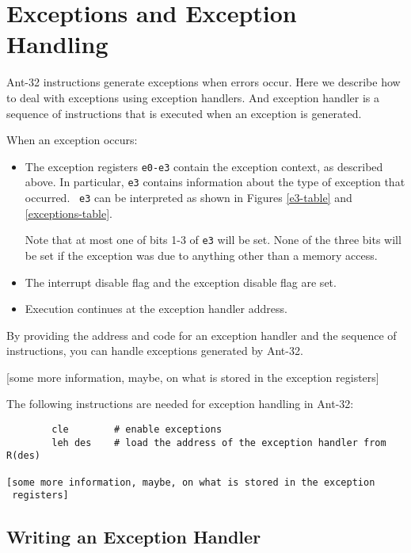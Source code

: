 

\chapter{Exceptions and Exception Handling}

Ant-32 instructions generate exceptions when errors occur.
Here we describe how to deal with exceptions using 
exception handlers. And exception handler is a sequence
of instructions that is executed when an exception is 
generated. 

When an exception occurs:

\begin{itemize}

\item The exception registers {\tt e0-e3} contain the exception
        context, as described above.  In particular, {\tt e3} contains
        information about the type of exception that occurred.  {\tt
        e3} can be interpreted as shown in Figures \ref{e3-table} and
        \ref{exceptions-table}.

        Note that at most one of bits 1-3 of {\tt e3} will be set.
        None of the three bits will be set if the exception was due to
        anything other than a memory access.

\item The interrupt disable flag and the exception disable flag are
        set.

\item Execution continues at the exception handler address.

\end{itemize}

By providing the address and code for an exception
handler and the sequence of instructions, you can handle 
exceptions generated by Ant-32.

[some more information, maybe, on what is stored in the exception
 registers]

The following instructions are needed for exception handling in 
Ant-32: 

\begin{verbatim}
        cle        # enable exceptions
        leh des    # load the address of the exception handler from R(des) 

[some more information, maybe, on what is stored in the exception
 registers]
\end{verbatim}

\section{Writing an Exception Handler}

